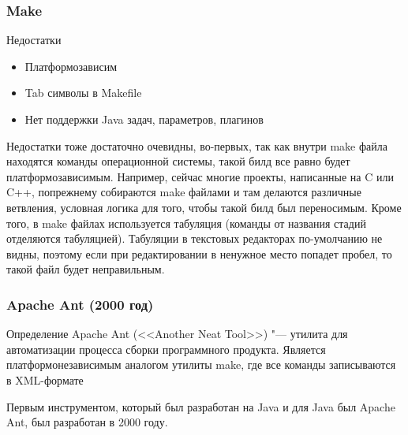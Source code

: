 \documentclass{../industrial-development}
\begin{document}
\begin{frame} \frametitle{Make}
	\begin{block}{Недостатки}
	\begin{itemize}
		\item Платформозависим
		\item Tab символы в Makefile
		\item Нет поддержки Java задач, параметров,
		плагинов
	\end{itemize}
	\end{block}
\end{frame}

\lecturenotes
Недостатки тоже достаточно очевидны, во-первых, так как внутри make файла находятся команды операционной системы, такой билд все равно будет платформозависимым. Например, сейчас многие проекты, написанные на C или C++, попрежнему собираются make файлами и там делаются различные ветвления, условная логика для того, чтобы такой билд был переносимым.
Кроме того, в make файлах используется табуляция (команды от названия стадий отделяются табуляцией). Табуляции в текстовых редакторах по-умолчанию не видны, поэтому если при редактировании в ненужное место попадет пробел, то такой файл будет неправильным.
~\cite{Yandex_Build_Automation}

\begin{frame} \frametitle{Apache Ant (2000 год)}
	\begin{block}{Определение}
		Apache Ant (<<Another Neat Tool>>) "--- утилита для автоматизации процесса сборки программного продукта. Является платформонезависимым аналогом утилиты make, где все команды записываются в XML-формате
	\end{block}
\end{frame}

\lecturenotes
Первым инструментом, который был разработан на Java и для Java был Apache Ant, был разработан в 2000 году.
~\cite{Wiki_Apache_Ant}
~\cite{Yandex_Build_Automation}
\end{document}
